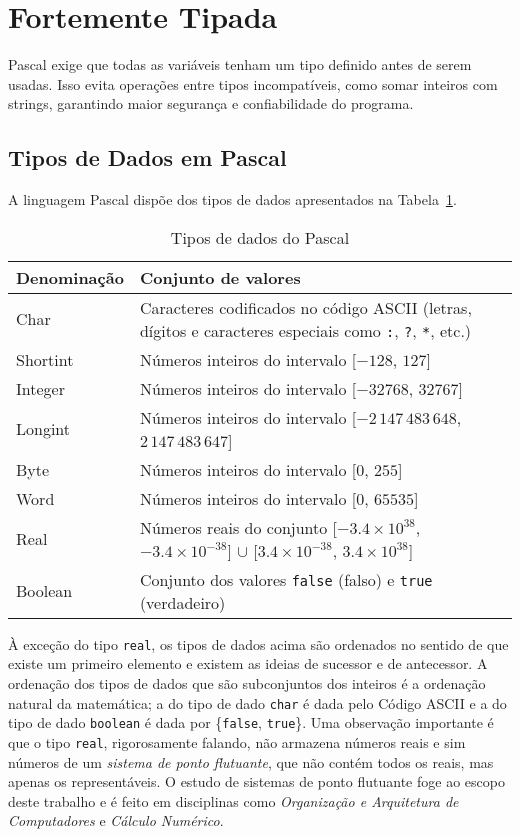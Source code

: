 \documentclass[12pt,a4paper,oneside]{abntex2}
\begin{document}
\section{Fortemente Tipada}
Pascal exige que todas as variáveis tenham um tipo definido antes de serem usadas. Isso evita operações entre tipos incompatíveis, como somar inteiros com strings, garantindo maior segurança e confiabilidade do programa.

\subsection{Tipos de Dados em Pascal}
A linguagem Pascal dispõe dos tipos de dados apresentados na Tabela~\ref{tab:tipos-pascal}.

\begin{table}[H]
    \centering
    \caption{Tipos de dados do Pascal}
    \label{tab:tipos-pascal}
    \begin{tabular}{|l|p{10cm}|}
        \hline
        \textbf{Denominação} & \textbf{Conjunto de valores} \\ \hline
        Char & Caracteres codificados no código ASCII (letras, dígitos e caracteres especiais como \texttt{:}, \texttt{?}, \texttt{*}, etc.) \\ \hline
        Shortint & Números inteiros do intervalo [$-128$, $127$] \\ \hline
        Integer & Números inteiros do intervalo [$-32768$, $32767$] \\ \hline
        Longint & Números inteiros do intervalo [$-2\,147\,483\,648$, $2\,147\,483\,647$] \\ \hline
        Byte & Números inteiros do intervalo [$0$, $255$] \\ \hline
        Word & Números inteiros do intervalo [$0$, $65535$] \\ \hline
        Real & Números reais do conjunto [$-3.4 \times 10^{38}$, $-3.4 \times 10^{-38}$] $\cup$ [$3.4 \times 10^{-38}$, $3.4 \times 10^{38}$] \\ \hline
        Boolean & Conjunto dos valores \texttt{false} (falso) e \texttt{true} (verdadeiro) \\ \hline
    \end{tabular}
\end{table}

À exceção do tipo \texttt{real}, os tipos de dados acima são ordenados no sentido de que existe um primeiro elemento e existem as ideias de sucessor e de antecessor. A ordenação dos tipos de dados que são subconjuntos dos inteiros é a ordenação natural da matemática; a do tipo de dado \texttt{char} é dada pelo Código ASCII e a do tipo de dado \texttt{boolean} é dada por \{\texttt{false}, \texttt{true}\}. Uma observação importante é que o tipo \texttt{real}, rigorosamente falando, não armazena números reais e sim números de um \textit{sistema de ponto flutuante}, que não contém todos os reais, mas apenas os representáveis. O estudo de sistemas de ponto flutuante foge ao escopo deste trabalho e é feito em disciplinas como \textit{Organização e Arquitetura de Computadores} e \textit{Cálculo Numérico}.
\end{document}
